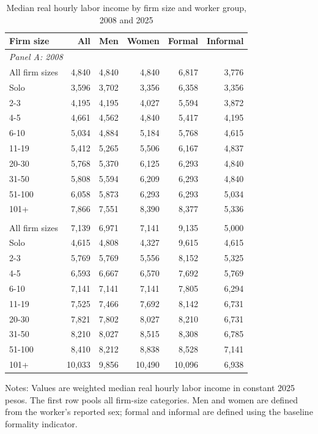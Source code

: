 \begin{table}[!htbp]
  \centering
  \caption{Median real hourly labor income by firm size and worker group, 2008 and 2025}
  \label{tab:descriptive-wage-groups-median-2008-2025}
  \small
  \begin{tabular}{lrrrrr}
    \toprule
    Firm size & All & Men & Women & Formal & Informal \\
    \midrule
    \multicolumn{6}{l}{\textit{Panel A: 2008}} \\
    All firm sizes & 4,840 & 4,840 & 4,840 & 6,817 & 3,776 \\
    Solo & 3,596 & 3,702 & 3,356 & 6,358 & 3,356 \\
    2-3 & 4,195 & 4,195 & 4,027 & 5,594 & 3,872 \\
    4-5 & 4,661 & 4,562 & 4,840 & 5,417 & 4,195 \\
    6-10 & 5,034 & 4,884 & 5,184 & 5,768 & 4,615 \\
    11-19 & 5,412 & 5,265 & 5,506 & 6,167 & 4,837 \\
    20-30 & 5,768 & 5,370 & 6,125 & 6,293 & 4,840 \\
    31-50 & 5,808 & 5,594 & 6,209 & 6,293 & 4,840 \\
    51-100 & 6,058 & 5,873 & 6,293 & 6,293 & 5,034 \\
    101+ & 7,866 & 7,551 & 8,390 & 8,377 & 5,336 \\
    \addlinespace
    \multicolumn{6}{l}{\textit{Panel B: 2025}} \\
    All firm sizes & 7,139 & 6,971 & 7,141 & 9,135 & 5,000 \\
    Solo & 4,615 & 4,808 & 4,327 & 9,615 & 4,615 \\
    2-3 & 5,769 & 5,769 & 5,556 & 8,152 & 5,325 \\
    4-5 & 6,593 & 6,667 & 6,570 & 7,692 & 5,769 \\
    6-10 & 7,141 & 7,141 & 7,141 & 7,805 & 6,294 \\
    11-19 & 7,525 & 7,466 & 7,692 & 8,142 & 6,731 \\
    20-30 & 7,821 & 7,802 & 8,027 & 8,210 & 6,731 \\
    31-50 & 8,210 & 8,027 & 8,515 & 8,308 & 6,785 \\
    51-100 & 8,410 & 8,212 & 8,838 & 8,528 & 7,141 \\
    101+ & 10,033 & 9,856 & 10,490 & 10,096 & 6,938 \\
    \bottomrule
  \end{tabular}
  \vspace{0.3em}
  \begin{minipage}{0.95\textwidth}
  \footnotesize
  Notes: Values are weighted median real hourly labor income in constant 2025 pesos. The first row pools all firm-size categories. Men and women are defined from the worker's reported sex; formal and informal are defined using the baseline formality indicator.
  \end{minipage}
\end{table}
